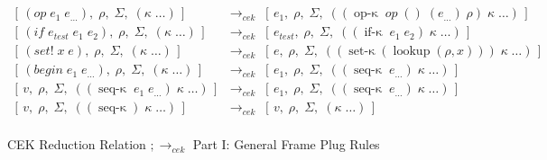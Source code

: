 \begin{figure}[!h]
{\begin{minipage}{0.95\textwidth}
\begin{align*}
        [\,e_1,\;\rho_{op},\;\Sigma,\\
        &\; \hspace{1.5cm} \;((\operatorname{op-\kappa}\;op\;(v\;\ldots\;v_1)\;(e_{\ldots})\;\rho_{op})\;\kappa\;\ldots)\,]\\
%
        [\,(op\;e_1\;e_{\ldots}),\;\rho,\;\Sigma,\;(\kappa\;\ldots)\,]
        &\;\longrightarrow_{\textit{cek}}\;
        [\,e_1,\;\rho,\;\Sigma,\;((\operatorname{op-\kappa}\;op\;()\;(e_{\ldots})\;\rho)\;\kappa\;\ldots)\,]\\
%
        [\,(if\;e_{test}\;e_1\;e_2),\;\rho,\;\Sigma,\;(\kappa\;\ldots)\,]
        &\;\longrightarrow_{\textit{cek}}\;
        [\,e_{test},\;\rho,\;\Sigma,\;((\operatorname{if-\kappa}\;e_1\;e_2)\;\kappa\;\ldots)\,]\\
%
        [\,(set!\;x\;e),\;\rho,\;\Sigma,\;(\kappa\;\ldots)\,]
        &\;\longrightarrow_{\textit{cek}}\;
        [\,e,\;\rho,\;\Sigma,\;((\operatorname{set-\kappa}(\operatorname{lookup}(\rho,x)))\;\kappa\;\ldots)\,]\\
%
        [\,(begin\;e_1\;e_{\ldots}),\;\rho,\;\Sigma,\;(\kappa\;\ldots)\,]
        &\;\longrightarrow_{\textit{cek}}\;
        [\,e_1,\;\rho,\;\Sigma,\;((\operatorname{seq-\kappa}\;e_{\ldots})\;\kappa\;\ldots)\,]\\
%
        [\,v,\;\rho,\;\Sigma,\;((\operatorname{seq-\kappa}\;e_1\;e_{\ldots})\;\kappa\;\ldots)\,]
        &\;\longrightarrow_{\textit{cek}}\;
        [\,e_1,\;\rho,\;\Sigma,\;((\operatorname{seq-\kappa}\;e_{\ldots})\;\kappa\;\ldots)\,]\\
%
        [\,v,\;\rho,\;\Sigma,\;((\operatorname{seq-\kappa})\;\kappa\;\ldots)\,]
        &\;\longrightarrow_{\textit{cek}}\;
        [\,v,\;\rho,\;\Sigma,\;(\kappa\;\ldots)\,]\\
      \end{align*}
    \end{minipage}%
  }
  \vspace{0.6em}
  \caption{CEK Reduction Relation $;\longrightarrow_{\textit{cek}}$ Part I: General Frame Plug Rules}
  \label{fig:cek-reduction-relation-redacted-general}
\end{figure}
